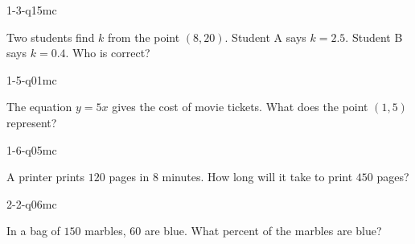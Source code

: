 
\begin{practiceQuestion}{1-3-q15}{mc}
\begin{questionText}
Two students find $k$ from the point $(8, 20)$. Student A says $k = 2.5$. Student B says $k = 0.4$. Who is correct?
\end{questionText}
\end{practiceQuestion}

\begin{practiceQuestion}{1-5-q01}{mc}
\begin{questionText}
The equation $y = 5x$ gives the cost of movie tickets. What does the point $(1, 5)$ represent?
\end{questionText}
\end{practiceQuestion}

\begin{practiceQuestion}{1-6-q05}{mc}
\begin{questionText}
A printer prints $120$ pages in $8$ minutes. How long will it take to print $450$ pages?
\end{questionText}
\end{practiceQuestion}

\begin{practiceQuestion}{2-2-q06}{mc}
\begin{questionText}
In a bag of $150$ marbles, $60$ are blue. What percent of the marbles are blue?
\end{questionText}
\end{practiceQuestion}

